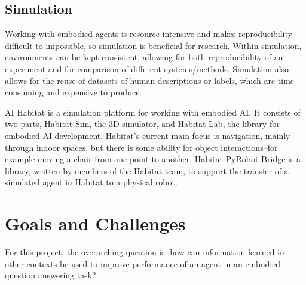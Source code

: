 \documentclass{article}
\begin{document}

\subsection{Simulation}
Working with embodied agents is resource intensive and makes reproducibility difficult to impossible, so simulation is beneficial for research. Within simulation, environments can be kept consistent, allowing for both reproducibility of an experiment and for comparison of different systems/methods. Simulation also allows for the reuse of datasets of human descriptions or labels, which are time-consuming and expensive to produce.  

AI Habitat is a simulation platform for working with embodied AI\cite{habitat19iccv}. It consists of two parts, Habitat-Sim, the 3D simulator, and Habitat-Lab, the library for embodied AI development. Habitat's current main focus is navigation, mainly through indoor spaces, but there is some ability for object interactions--for example moving a chair from one point to another. Habitat-PyRobot Bridge is a library, written by members of the Habitat team, to support the transfer of a simulated agent in Habitat to a physical robot\cite{Kadian_2020}. 


\section{Goals and Challenges}

For this project, the overarching question is: how can information learned in other contexts be used to improve performance of an agent in an embodied question answering task? %
\end{document}
